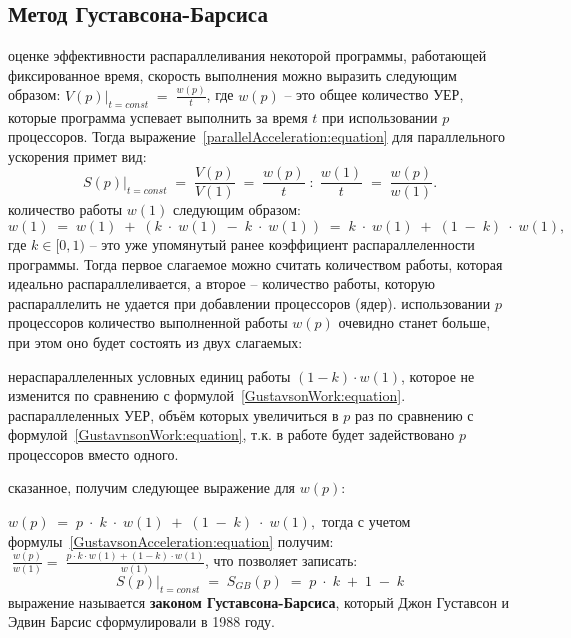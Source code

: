 { %
	\subsection{Метод Густавсона-Барсиса}
	 оценке эффективности распараллеливания некоторой программы, работающей фиксированное время, скорость выполнения можно выразить следующим образом: $\left.V(p)\right|_{t=const}\;=\;\frac {w(p)}t$, где $w(p)$ – это общее количество УЕР, которые программа успевает выполнить за время $t$ при использовании $p$ процессоров. Тогда выражение~\eqref{parallelAcceleration:equation} для параллельного ускорения примет вид:
	\begin{equation}
		\label{GustavsonAcceleration:equation}
		\left.S(p)\right|_{t=const}\;=\;\frac{V(p)}{V(1)}\;=\;\frac{w(p)}t\;:\;\frac{w(1)}t\;=\;\frac{w(p)}{w(1)}.
	\end{equation}
	 количество работы $w(1)$ следующим образом:
	\begin{equation}
		\label{GustavsonWork:equation}
		w(1)\;=\;w(1)\;+\;(k\;\cdot\;w(1)\;-\;k\;\cdot\;w(1))\;=\;k\;\cdot\;w(1)\;+\;(1\;-\;k)\;\cdot\;w(1),
	\end{equation}
	где $k\in\lbrack0,1)$ – это уже упомянутый ранее коэффициент распараллеленности программы. Тогда первое слагаемое можно считать количеством работы, которая идеально распараллеливается, а второе – количество работы, которую распараллелить не удается при добавлении процессоров (ядер).
	 использовании $p$ процессоров количество выполненной работы $w(p)$ очевидно станет больше, при этом оно  будет состоять из двух слагаемых: 
	\begin{itemize}
		 нераспараллеленных условных единиц работы $(1-k)\cdot w(1)$, которое не изменится по сравнению с формулой~\eqref{GustavsonWork:equation}.
		 распараллеленных УЕР, объём которых увеличиться в $p$ раз по сравнению с формулой~\eqref{GustavnsonWork:equation}, т.к. в работе будет задействовано $p$ процессоров вместо одного.
	\end{itemize}
	 сказанное, получим следующее выражение для $w(p)$:
	\par$w(p)\;=\;p\;\cdot\;k\;\cdot\;w(1)\;+\;(1\;-\;k)\;\cdot\;w(1),$ тогда с учетом формулы~\eqref{GustavsonAcceleration:equation} получим: $\;\frac{w(p)}{w(1)}=\;\frac{p\cdot k\cdot w(1)+(1-k)\cdot w(1)}{w(1)}$, что позволяет записать:
	\begin{equation}
		\left.S(p)\right|_{t=const}\;=\;S_{GB}(p)\;=\;p\;\cdot\;k\;+\;1\;-\;k
	\end{equation}
	 выражение называется \textbf{законом Густавсона-Барсиса}, который Джон Густавсон и Эдвин Барсис сформулировали в 1988 году. 
	\par
}